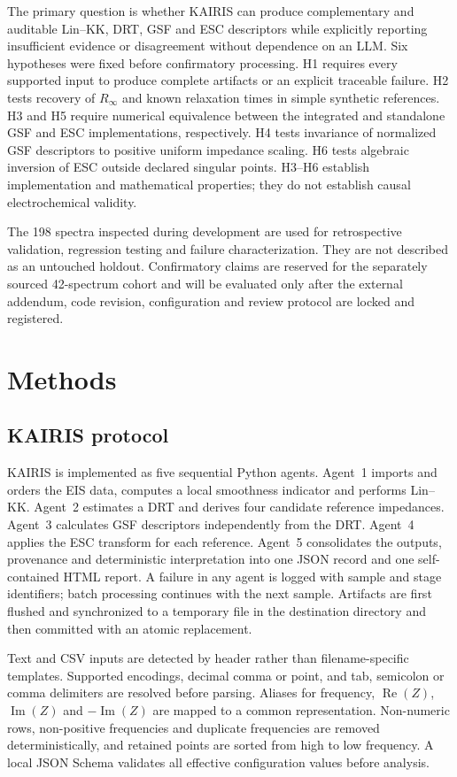 \documentclass[a4paper,fleqn]{cas-sc}
\begin{document}
The primary question is whether KAIRIS can produce complementary and auditable
Lin--KK, DRT, GSF and ESC descriptors while explicitly reporting insufficient
evidence or disagreement without dependence on an LLM. Six hypotheses were
fixed before confirmatory processing. H1 requires every supported input to
produce complete artifacts or an explicit traceable failure. H2 tests recovery
of $R_\infty$ and known relaxation times in simple synthetic references. H3 and
H5 require numerical equivalence between the integrated and standalone GSF and
ESC implementations, respectively. H4 tests invariance of normalized GSF
descriptors to positive uniform impedance scaling. H6 tests algebraic inversion
of ESC outside declared singular points. H3--H6 establish implementation and
mathematical properties; they do not establish causal electrochemical validity.

The 198 spectra inspected during development are used for retrospective
validation, regression testing and failure characterization. They are not
described as an untouched holdout. Confirmatory claims are reserved for the
separately sourced 42-spectrum cohort and will be evaluated only after the
external addendum, code revision, configuration and review protocol are locked
and registered.

\section{Methods}\label{sec:methods}

\subsection{KAIRIS protocol}\label{sec:protocol}

KAIRIS is implemented as five sequential Python agents. Agent~1 imports and
orders the EIS data, computes a local smoothness indicator and performs Lin--KK.
Agent~2 estimates a DRT and derives four candidate reference impedances.
Agent~3 calculates GSF descriptors independently from the DRT. Agent~4 applies
the ESC transform for each reference. Agent~5 consolidates the outputs,
provenance and deterministic interpretation into one JSON record and one
self-contained HTML report. A failure in any agent is logged with sample and
stage identifiers; batch processing continues with the next sample. Artifacts
are first flushed and synchronized to a temporary file in the destination
directory and then committed with an atomic replacement.

Text and CSV inputs are detected by header rather than filename-specific
templates. Supported encodings, decimal comma or point, and tab, semicolon or
comma delimiters are resolved before parsing. Aliases for frequency,
$\operatorname{Re}(Z)$, $\operatorname{Im}(Z)$ and $-\operatorname{Im}(Z)$ are
mapped to a common representation. Non-numeric rows, non-positive frequencies
and duplicate frequencies are removed deterministically, and retained points are
sorted from high to low frequency. A local JSON Schema validates all effective
configuration values before analysis.
\end{document}
